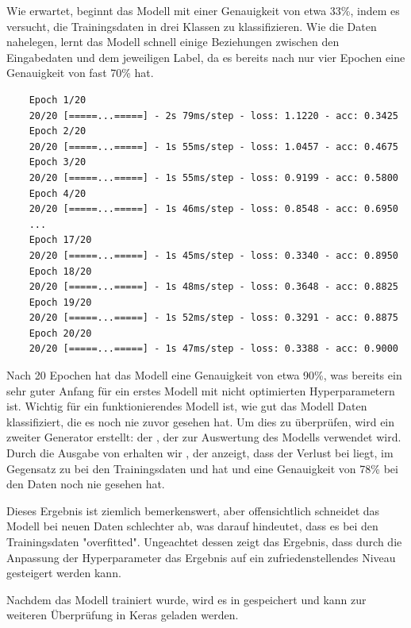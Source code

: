 Wie erwartet, beginnt das Modell mit einer Genauigkeit von etwa 33\%, indem es versucht, die Trainingsdaten in drei Klassen zu klassifizieren.
Wie die Daten nahelegen, lernt das Modell schnell einige Beziehungen zwischen den Eingabedaten und dem jeweiligen Label, da es bereits nach nur vier Epochen eine Genauigkeit von fast 70\% hat.

\begin{lstlisting}
    Epoch 1/20
    20/20 [=====...=====] - 2s 79ms/step - loss: 1.1220 - acc: 0.3425
    Epoch 2/20
    20/20 [=====...=====] - 1s 55ms/step - loss: 1.0457 - acc: 0.4675
    Epoch 3/20
    20/20 [=====...=====] - 1s 55ms/step - loss: 0.9199 - acc: 0.5800
    Epoch 4/20
    20/20 [=====...=====] - 1s 46ms/step - loss: 0.8548 - acc: 0.6950
    ...
    Epoch 17/20
    20/20 [=====...=====] - 1s 45ms/step - loss: 0.3340 - acc: 0.8950
    Epoch 18/20
    20/20 [=====...=====] - 1s 48ms/step - loss: 0.3648 - acc: 0.8825
    Epoch 19/20
    20/20 [=====...=====] - 1s 52ms/step - loss: 0.3291 - acc: 0.8875
    Epoch 20/20
    20/20 [=====...=====] - 1s 47ms/step - loss: 0.3388 - acc: 0.9000
\end{lstlisting}

Nach 20 Epochen hat das Modell eine Genauigkeit von etwa 90\%, was bereits ein sehr guter Anfang für ein erstes Modell mit nicht optimierten Hyperparametern ist.
Wichtig für ein funktionierendes Modell ist, wie gut das Modell Daten klassifiziert, die es noch nie zuvor gesehen hat.
Um dies zu überprüfen, wird ein zweiter Generator erstellt: der , der zur Auswertung des Modells verwendet wird.
Durch die Ausgabe von  erhalten wir \code{[0.6071663084129493, 0.7866667]}, der anzeigt, dass der Verlust bei  liegt, im Gegensatz zu  bei den Trainingsdaten und hat und eine Genauigkeit von 78\% bei den Daten noch nie gesehen hat.

Dieses Ergebnis ist ziemlich bemerkenswert, aber offensichtlich schneidet das Modell bei neuen Daten schlechter ab, was darauf hindeutet, dass es bei den Trainingsdaten "overfitted".
Ungeachtet dessen zeigt das Ergebnis, dass durch die Anpassung der Hyperparameter das Ergebnis auf ein zufriedenstellendes Niveau gesteigert werden kann.

Nachdem das Modell trainiert wurde, wird es in  gespeichert und kann zur weiteren Überprüfung in Keras geladen werden.

